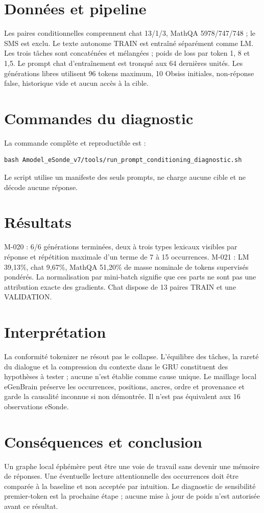\documentclass[11pt,a4paper]{report}
\begin{document}
\section{Données et pipeline}
Les paires conditionnelles comprennent chat 13/1/3, MathQA 5978/747/748 ; le SMS est exclu. Le texte autonome TRAIN est entraîné séparément comme LM. Les trois tâches sont concaténées et mélangées ; poids de loss par token 1, 8 et 1,5. Le prompt chat d'entraînement est tronqué aux 64 dernières unités. Les générations libres utilisent 96 tokens maximum, 10 Obsiss initiales, non-réponse false, historique vide et aucun accès à la cible.
\section{Commandes du diagnostic}
La commande complète et reproductible est :
\begin{verbatim}
bash Amodel_eSonde_v7/tools/run_prompt_conditioning_diagnostic.sh
\end{verbatim}
Le script utilise un manifeste des seuls prompts, ne charge aucune cible et ne décode aucune réponse.
\section{Résultats}
M-020 : 6/6 générations terminées, deux à trois types lexicaux visibles par réponse et répétition maximale d'un terme de 7 à 15 occurrences. M-021 : LM 39,13\%, chat 9,67\%, MathQA 51,20\% de masse nominale de tokens supervisés pondérés. La normalisation par mini-batch signifie que ces parts ne sont pas une attribution exacte des gradients. Chat dispose de 13 paires TRAIN et une VALIDATION.
\section{Interprétation}
La conformité tokenizer ne résout pas le collapse. L'équilibre des tâches, la rareté du dialogue et la compression du contexte dans le GRU constituent des hypothèses à tester ; aucune n'est établie comme cause unique. Le maillage local eGenBrain préserve les occurrences, positions, ancres, ordre et provenance et garde la causalité inconnue si non démontrée. Il n'est pas équivalent aux 16 observations eSonde.
\section{Conséquences et conclusion}
Un graphe local éphémère peut être une voie de travail sans devenir une mémoire de réponses. Une éventuelle lecture attentionnelle des occurrences doit être comparée à la baseline et non acceptée par intuition. Le diagnostic de sensibilité premier-token est la prochaine étape ; aucune mise à jour de poids n'est autorisée avant ce résultat.
\end{document}
